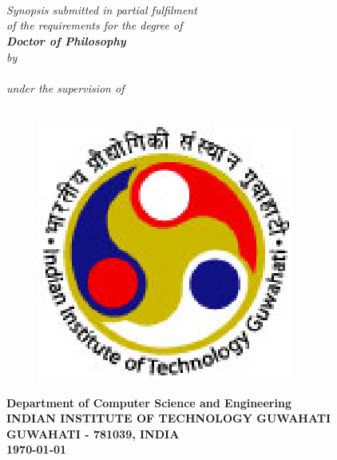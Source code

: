 \documentclass[twoside,fancyhdr]{18_format/csethesis}
\begin{document}
  
%  
\chapter*{}
\thispagestyle{empty}
\begin{center}
\textheight 16in \textwidth 12.5in {\huge\sf  \textbf{\the\phdtitle}}\\[20ex]
{\Large{\textit{
{Synopsis submitted in partial fulfilment \\of the requirements
for the degree of\\
[5ex]{\Large \bf Doctor of Philosophy}
}}}}\\
[5ex] \large\emph{by} \\[1ex]
{\sf \sf \Large\bf{\the\name}}\\[5ex]
\large\textit{under the supervision of}\\[2ex]
{\Large \bf \the\guide} \\[5ex]

 \begin{figure}
    \begin{minipage}{\linewidth}
      \centering
      \includegraphics[scale=.9]{0-title/iitg_logo}
    \end{minipage} 
  \end{figure}

{\large \bf Department of Computer Science and Engineering}  \\[1ex]
{\Large \bf{INDIAN INSTITUTE OF TECHNOLOGY GUWAHATI \\GUWAHATI - 781039, INDIA}}\\
{\large\bf {\today}}
\end{center}
\end{document}
